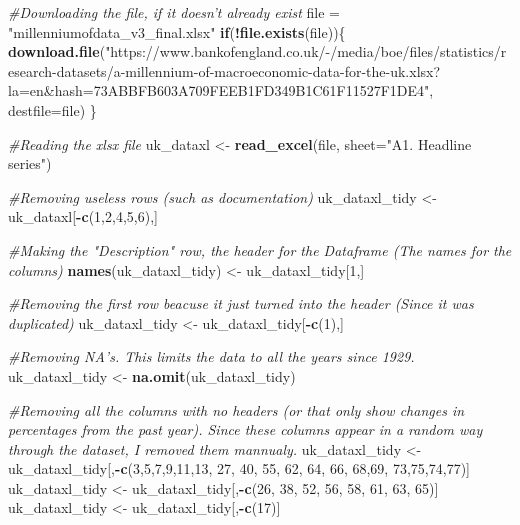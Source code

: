 \documentclass[]{article}
\newenvironment{Shaded}{\begin{snugshade}}{\end{snugshade}}
\newcommand{\KeywordTok}[1]{\textcolor[rgb]{0.13,0.29,0.53}{\textbf{#1}}}
\newcommand{\DataTypeTok}[1]{\textcolor[rgb]{0.13,0.29,0.53}{#1}}
\newcommand{\DecValTok}[1]{\textcolor[rgb]{0.00,0.00,0.81}{#1}}
\newcommand{\StringTok}[1]{\textcolor[rgb]{0.31,0.60,0.02}{#1}}
\newcommand{\CommentTok}[1]{\textcolor[rgb]{0.56,0.35,0.01}{\textit{#1}}}
\newcommand{\ControlFlowTok}[1]{\textcolor[rgb]{0.13,0.29,0.53}{\textbf{#1}}}
\newcommand{\OperatorTok}[1]{\textcolor[rgb]{0.81,0.36,0.00}{\textbf{#1}}}
\newcommand{\NormalTok}[1]{#1}
\begin{document}
\begin{Shaded}
\begin{Highlighting}[]
\CommentTok{#Downloading the file, if it doesn't already exist}
\NormalTok{file =}\StringTok{ "millenniumofdata_v3_final.xlsx"}
\ControlFlowTok{if}\NormalTok{(}\OperatorTok{!}\KeywordTok{file.exists}\NormalTok{(file))\{}
  \KeywordTok{download.file}\NormalTok{(}\StringTok{"https://www.bankofengland.co.uk/-/media/boe/files/statistics/research-datasets/a-millennium-of-macroeconomic-data-for-the-uk.xlsx?la=en&hash=73ABBFB603A709FEEB1FD349B1C61F11527F1DE4"}\NormalTok{, }\DataTypeTok{destfile=}\NormalTok{file)}
\NormalTok{\}}

\CommentTok{#Reading the xlsx file}
\NormalTok{uk_dataxl <-}\StringTok{  }\KeywordTok{read_excel}\NormalTok{(file, }\DataTypeTok{sheet=}\StringTok{"A1. Headline series"}\NormalTok{)}

\CommentTok{#Removing useless rows (such as documentation)}
\NormalTok{uk_dataxl_tidy <-}\StringTok{ }\NormalTok{uk_dataxl[}\OperatorTok{-}\KeywordTok{c}\NormalTok{(}\DecValTok{1}\NormalTok{,}\DecValTok{2}\NormalTok{,}\DecValTok{4}\NormalTok{,}\DecValTok{5}\NormalTok{,}\DecValTok{6}\NormalTok{),]}

\CommentTok{#Making the "Description" row, the header for the Dataframe (The names for the columns)}
\KeywordTok{names}\NormalTok{(uk_dataxl_tidy) <-}\StringTok{ }\NormalTok{uk_dataxl_tidy[}\DecValTok{1}\NormalTok{,]}

\CommentTok{#Removing the first row beacuse it just turned into the header (Since it was duplicated)}
\NormalTok{uk_dataxl_tidy <-}\StringTok{ }\NormalTok{uk_dataxl_tidy[}\OperatorTok{-}\KeywordTok{c}\NormalTok{(}\DecValTok{1}\NormalTok{),]}

\CommentTok{#Removing NA's. This limits the data to all the years since 1929.}
\NormalTok{uk_dataxl_tidy <-}\StringTok{ }\KeywordTok{na.omit}\NormalTok{(uk_dataxl_tidy)}

\CommentTok{#Removing all the columns with no headers (or that only show changes in percentages from the past year). Since these columns appear in a random way through the dataset, I removed them mannualy.}
\NormalTok{uk_dataxl_tidy <-}\StringTok{ }\NormalTok{uk_dataxl_tidy[,}\OperatorTok{-}\KeywordTok{c}\NormalTok{(}\DecValTok{3}\NormalTok{,}\DecValTok{5}\NormalTok{,}\DecValTok{7}\NormalTok{,}\DecValTok{9}\NormalTok{,}\DecValTok{11}\NormalTok{,}\DecValTok{13}\NormalTok{, }\DecValTok{27}\NormalTok{, }\DecValTok{40}\NormalTok{, }\DecValTok{55}\NormalTok{, }\DecValTok{62}\NormalTok{, }\DecValTok{64}\NormalTok{, }\DecValTok{66}\NormalTok{, }\DecValTok{68}\NormalTok{,}\DecValTok{69}\NormalTok{, }\DecValTok{73}\NormalTok{,}\DecValTok{75}\NormalTok{,}\DecValTok{74}\NormalTok{,}\DecValTok{77}\NormalTok{)]}
\NormalTok{uk_dataxl_tidy <-}\StringTok{ }\NormalTok{uk_dataxl_tidy[,}\OperatorTok{-}\KeywordTok{c}\NormalTok{(}\DecValTok{26}\NormalTok{, }\DecValTok{38}\NormalTok{, }\DecValTok{52}\NormalTok{, }\DecValTok{56}\NormalTok{, }\DecValTok{58}\NormalTok{, }\DecValTok{61}\NormalTok{, }\DecValTok{63}\NormalTok{, }\DecValTok{65}\NormalTok{)]}
\NormalTok{uk_dataxl_tidy <-}\StringTok{ }\NormalTok{uk_dataxl_tidy[,}\OperatorTok{-}\KeywordTok{c}\NormalTok{(}\DecValTok{17}\NormalTok{)]}


\end{Highlighting}
\end{Shaded}
\end{document}
